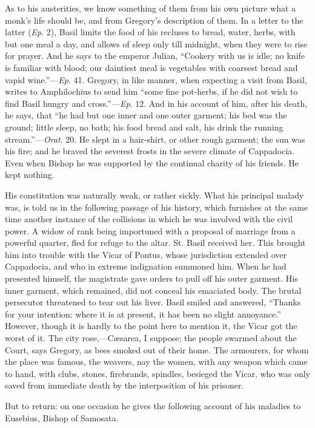 As to his austerities, we know something of them from his own
picture what a monk's life should be, and from Gregory's description
of them. In a letter to the latter (\emph{Ep}. 2), Basil limits the
food of his recluses to bread, water, herbs, with but one meal a day,
and allows of sleep only till midnight, when they were to rise for
prayer. And he says to the emperor Julian, ``Cookery with us is
idle; no knife is familiar with blood; our daintiest meal is
vegetables with coarsest bread and vapid wine.''—\emph{Ep}. 41.
Gregory, in like manner, when expecting a visit from Basil, writes to
Amphilochius to send him ``some fine pot-herbs, if he did not wish
to find Basil hungry and cross.''—\emph{Ep}. 12. And in his
account of him, after his death, he says, that ``he had but one
inner and one outer garment; his bed was the ground; little sleep, no
bath; his food bread and salt, his drink the running
stream.''—\emph{Orat}. 20. He slept in a hair-shirt, or other
rough garment; the sun was his fire; and he braved the severest frosts
in the severe climate of Cappadocia. Even when Bishop he was supported
by the continual charity of his friends. He kept nothing.

His constitution was naturally weak, or rather sickly. What his
principal malady was, is told us in the following passage of his
history, which furnishes at the same time another instance of the
collisions in which he was involved with the civil power. A widow of
rank being importuned with a proposal of marriage from a powerful
quarter, fled for refuge to the altar. St. Basil received her. This
brought him into trouble with the Vicar of Pontus, whose jurisdiction
extended over Cappadocia, and who in extreme indignation summoned him.
When he had presented himself, the magistrate gave orders to pull off
his outer garment. His inner garment, which remained, did not conceal
his emaciated body. The brutal persecutor threatened to tear out his
liver. Basil smiled and answered, ``Thanks for your intention:
where it is at present, it has been no slight annoyance.''
However, though it is hardly to the point here to mention it, the
Vicar got the worst of it. The city rose,—Cæsarea, I suppose; the
people swarmed about the Court, says Gregory, as bees smoked out of
their home. The armourers, for whom the place was famous, the weavers,
nay the women, with any weapon which came to hand, with clubs, stones,
firebrands, spindles, besieged the Vicar, who was only saved from
immediate death by the interposition of his prisoner.

But to return: on one occasion he gives the following account of
his maladies to Eusebius, Bishop of Samosata.


